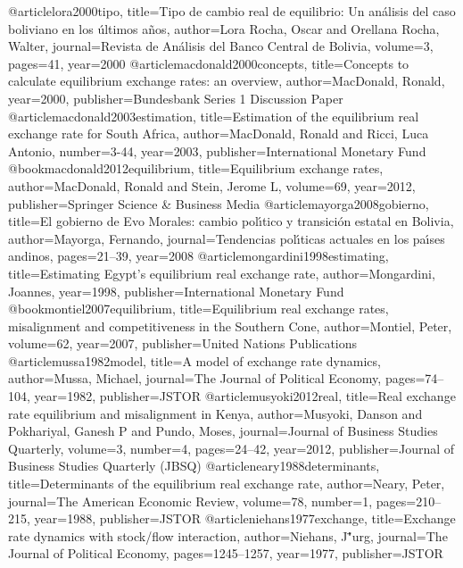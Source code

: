 @article{lora2000tipo,
  title={Tipo de cambio real de equilibrio: Un an{\'a}lisis del caso boliviano en los {\'u}ltimos a{\~n}os},
  author={Lora Rocha, Oscar and Orellana Rocha, Walter},
  journal={Revista de An{\'a}lisis del Banco Central de Bolivia},
  volume={3},
  pages={41},
  year={2000}
}
@article{macdonald2000concepts,
  title={Concepts to calculate equilibrium exchange rates: an overview},
  author={MacDonald, Ronald},
  year={2000},
  publisher={Bundesbank Series 1 Discussion Paper}
}
@article{macdonald2003estimation,
  title={Estimation of the equilibrium real exchange rate for South Africa},
  author={MacDonald, Ronald and Ricci, Luca Antonio},
  number={3-44},
  year={2003},
  publisher={International Monetary Fund}
}
@book{macdonald2012equilibrium,
  title={Equilibrium exchange rates},
  author={MacDonald, Ronald and Stein, Jerome L},
  volume={69},
  year={2012},
  publisher={Springer Science \& Business Media}
}
@article{mayorga2008gobierno,
  title={El gobierno de Evo Morales: cambio pol{\'\i}tico y transici{\'o}n estatal en Bolivia},
  author={Mayorga, Fernando},
  journal={Tendencias pol{\'\i}ticas actuales en los pa{\'\i}ses andinos},
  pages={21--39},
  year={2008}
}
@article{mongardini1998estimating,
  title={Estimating Egypt's equilibrium real exchange rate},
  author={Mongardini, Joannes},
  year={1998},
  publisher={International Monetary Fund}
}
@book{montiel2007equilibrium,
  title={Equilibrium real exchange rates, misalignment and competitiveness in the Southern Cone},
  author={Montiel, Peter},
  volume={62},
  year={2007},
  publisher={United Nations Publications}
}
@article{mussa1982model,
  title={A model of exchange rate dynamics},
  author={Mussa, Michael},
  journal={The Journal of Political Economy},
  pages={74--104},
  year={1982},
  publisher={JSTOR}
}
@article{musyoki2012real,
  title={Real exchange rate equilibrium and misalignment in Kenya},
  author={Musyoki, Danson and Pokhariyal, Ganesh P and Pundo, Moses},
  journal={Journal of Business Studies Quarterly},
  volume={3},
  number={4},
  pages={24--42},
  year={2012},
  publisher={Journal of Business Studies Quarterly (JBSQ)}
}
@article{neary1988determinants,
  title={Determinants of the equilibrium real exchange rate},
  author={Neary, Peter},
  journal={The American Economic Review},
  volume={78},
  number={1},
  pages={210--215},
  year={1988},
  publisher={JSTOR}
}
@article{niehans1977exchange,
  title={Exchange rate dynamics with stock/flow interaction},
  author={Niehans, J{\""u}rg},
  journal={The Journal of Political Economy},
  pages={1245--1257},
  year={1977},
  publisher={JSTOR}
}
